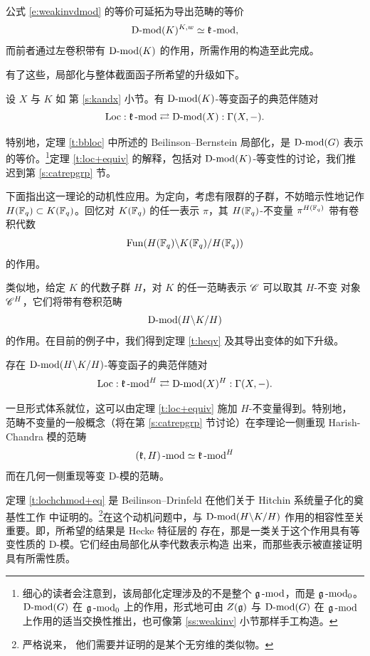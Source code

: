 公式 \eqref{e:weakinvdmod} 的等价可延拓为导出范畴的等价
%
\[
    \operatorname{D-mod}(K)^{K, w} \simeq \mathfrak{k}\operatorname{-mod},
\]
%
而前者通过左卷积带有 $\operatorname{D-mod}(K)$ 的作用，所需作用的构造至此完成。

\ssszh 有了这些，局部化与整体截面函子所希望的升级如下。

\begin{theo}\label{t:loc+equiv} 设 $X$ 与 $K$ 如
第 \ref{s:kandx} 小节。有 $\operatorname{D-mod}(K)$-等变函子的典范伴随对
%
\[
    \operatorname{Loc}: \mathfrak{k}\operatorname{-mod} \rightleftarrows \operatorname{D-mod}(X): \Gamma(X, -).
\]
%
\end{theo}

特别地，定理 \ref{t:bbloc} 中所述的 Beilinson--Bernstein 局部化，是
$\operatorname{D-mod}(G)$ 表示的等价。\footnote{细心的读者会注意到，该局部化定理涉及的不是整个
$\mathfrak{g}\operatorname{-mod}$，而是 $\mathfrak{g}\operatorname{-mod}_0$。$\operatorname{D-mod}(G)$ 在 $\mathfrak{g}\operatorname{-mod}_0$ 上的作用，形式地可由
$Z(\mathfrak{g})$ 与 $\operatorname{D-mod}(G)$ 在 $\mathfrak{g}\operatorname{-mod}$ 上作用的适当交换性推出，也可像第
\ref{ss:weakinv} 小节那样手工构造。}定理 \ref{t:loc+equiv} 的解释，包括对
$\operatorname{D-mod}(K)$-等变性的讨论，我们推迟到第 \ref{s:catrepgrp} 节。

\ssszh 下面指出这一理论的动机性应用。为定向，考虑有限群的子群，不妨暗示性地记作
$H(\mathbb{F}_q) \subset K(\mathbb{F}_q)$。回忆对 $K(\mathbb{F}_q)$ 的任一表示 $\pi$，其
$H(\mathbb{F}_q)$-不变量 $\pi^{H(\mathbb{F}_q)}$ 带有卷积代数
$$\operatorname{Fun}(H(\mathbb{F}_q) \backslash K(\mathbb{F}_q) /H(\mathbb{F}_q))$$ 的作用。

类似地，给定 $K$ 的代数子群 $H$，对 $K$ 的任一范畴表示 $\mathscr{C}$ 可以取其 $H$-不变
对象 $\mathscr{C}^H$，它们将带有卷积范畴
%
\[
   \operatorname{D-mod}(H \backslash K  / H)
\]
%
的作用。在目前的例子中，我们得到定理 \ref{t:heqv} 及其导出变体的如下升级。

\begin{theo}\label{t:lochchmod+eq}存在
$\operatorname{D-mod}(H \backslash K / H)$-等变函子的典范伴随对
%
\[
\operatorname{Loc}: \mathfrak{k}\operatorname{-mod}^H \rightleftarrows \operatorname{D-mod}(X)^H: \Gamma(X, -).
\]
%
\end{theo}

一旦形式体系就位，这可以由定理 \ref{t:loc+equiv} 施加 $H$-不变量得到。特别地，
范畴不变量的一般概念（将在第 \ref{s:catrepgrp} 节讨论）在李理论一侧重现
Harish-Chandra 模的范畴
%
\[
   (\mathfrak{k}, H)\operatorname{-mod} \simeq \mathfrak{k}\operatorname{-mod}^H
\]
%
而在几何一侧重现等变 D-模的范畴。

\ssszh\label{ss:hitchinhecke} 定理 \ref{t:lochchmod+eq} 是 Beilinson--Drinfeld
在他们关于 Hitchin 系统量子化的奠基性工作 \cite{bdh} 中证明的。\footnote{严格说来，
他们需要并证明的是某个无穷维的类似物。}在这个动机问题中，与
$\operatorname{D-mod}(H \backslash K / H)$ 作用的相容性至关重要。即，所希望的结果是 Hecke 特征层的
存在，那是一类关于这个作用具有等变性质的 D-模。它们经由局部化从李代数表示构造
出来，而那些表示被直接证明具有所需性质。

